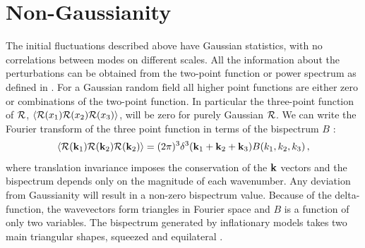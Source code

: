 \section{Non-Gaussianity}
\label{sec:fnl-intro}
The initial fluctuations described above have Gaussian statistics, with no
correlations between modes
on different scales. All the information about the perturbations can be obtained from the
two-point function or power spectrum as defined in . For a
Gaussian random 
field all higher point functions are either zero or combinations of the two-point function. In
particular the three-point function of $\mathcal{R}$, $\langle
\mathcal{R}(x_1)\mathcal{R}(x_2)\mathcal{R}(x_3)\rangle$, will be zero for purely Gaussian $\mathcal{R}$. We can
write the Fourier
transform of the three point function in terms of the bispectrum $B$
\cite{Bartolo:2004if}:
% 
\begin{equation}
 \langle \mathcal{R}(\textbf{k}_1)\mathcal{R}(\textbf{k}_2)\mathcal{R}(\textbf{k}_2)\rangle = (2\pi)^3 \delta^3(\textbf{k}_1 + \textbf{k}_2 + \textbf{k}_3) B(k_1, k_2,
k_3)\,,
\end{equation}
% 
where translation invariance imposes the conservation of the $\textbf{k}$ vectors and
the bispectrum
depends only on the magnitude of each wavenumber. Any deviation from Gaussianity
will result in a
non-zero bispectrum value. 
Because of the delta-function, the wavevectors form triangles in Fourier
space and $B$ is a function of only two variables. The bispectrum generated by
inflationary models
takes two main triangular shapes, squeezed and equilateral \cite{Babich:2004gb}.
 
